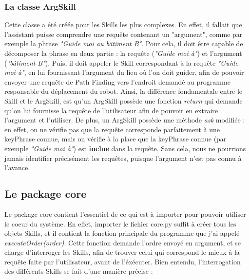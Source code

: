 \documentclass{report}
\begin{document}
      \subsubsection{La classe ArgSkill}
        {Cette classe a été créée pour les Skills les plus complexes. En effet, il
        fallait que l'assistant puisse comprendre une requête contenant un "argument",
        comme par exemple la phrase \textit{"Guide moi au bâtiment B"}. Pour cela,
        il doit être capable de décomposer la phrase en deux partie : la requête
        (\textit{"Guide moi à"}) et l'argument (\textit{"bâtiment B"}). Puis, il doit
        appeler le Skill correspondant à la requête \textit{"Guide moi à"}, en lui
        fournissant l'argument du lieu où l'on doit guider, afin de pouvoir envoyer
         une requête de Path Finding vers l'endroit demandé au programme responsable
          du déplacement du robot.\newline}
        {Ainsi, la différence fondamentale entre le Skill et le ArgSkill, est qu'un
         ArgSkill possède une fonction \textit{return} qui demande qu'on lui fournisse
        la requête de l'utilisateur afin de pouvoir en extraire l'argument et l'utiliser.
        De plus, un ArgSkill possède une méthode \textit{ask} modifiée : en effet,
        on ne vérifie pas que la requête corresponde parfaitement à une keyPhrase connue,
        mais on vérifie à la place que la keyPhrase connue (par exemple \textit{"Guide moi à"})
        est \textbf{inclue} dans la requête. Sans cela, nous ne pourrions jamais identifier
        précisément les requêtes, puisque l'argument n'est pas connu à l'avance.}


    \subsection{Le package core}
    {Le package core contient l'essentiel de ce qui est à importer pour pouvoir utiliser
     le coeur du système. En effet, importer le fichier core.py suffit à créer tous
     les objets Skills, et il contient la fonction principale du programme que j'ai
     appelé \textit{executeOrder(order)}. Cette fonction demande l'ordre envoyé en argument,
      et se charge d'interroger les Skills, afin de trouver celui qui correspond le
       mieux à la requête faite par l'utilisateur, avant de l'éxécuter. Bien entendu,
       l'interrogation des différents Skills se fait d'une manière précise :}
\end{document}
